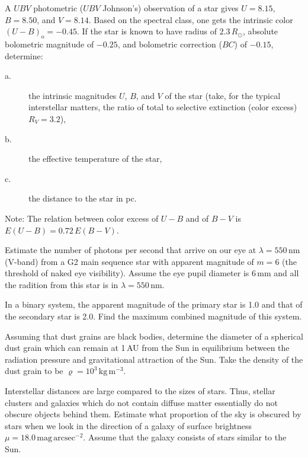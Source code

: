 A $UBV$ photometric ($UBV$ Johnson's) observation of a star gives
$U = 8.15$, $B = 8.50$, and $V = 8.14$. Based on the spectral class, one gets
the intrinsic color $(U-B)_{\mathrm{o}} = -0.45$. If the star is known to
have radius of $2.3\,R_\odot$, absolute bolometric magnitude of $-0.25$, and
bolometric correction ($BC$) of $-0.15$, determine:
\begin{description}
\item[a.] the intrinsic magnitudes $U$, $B$, and $V$ of the star (take, for
  the typical interstellar matters, the ratio of total to selective
  extinction (color excess) $R_V = 3.2$),
\item[b.] the effective temperature of the star,
\item[c.] the distance to the star in pc.
\end{description}
Note: The relation between color excess of $U-B$ and of $B-V$ is
$E(U-B) = 0.72\,E(B-V)$.

Estimate the number of photons per second that arrive on our eye at
$\lambda = 550$\,nm (V-band) from a G2 main sequence star with apparent
magnitude of $m = 6$ (the threshold of naked eye visibility). Assume the eye
pupil diameter is 6\,mm and all the radition %
from this star is in
$\lambda = 550$\,nm.

In a binary system, the apparent magnitude of the primary star is 1.0 and
that of the secondary star is 2.0. Find the maximum combined magnitude of
this system.

Assuming that dust grains are black bodies, determine the diameter of a
spherical dust grain which can remain at 1\,AU from the Sun in equilibrium
between the radiation pressure and gravitational attraction of the Sun. Take
the density of the dust grain to be
$\varrho = 10^{3}\,\mathrm{kg\,m^{-3}}$.

Interstellar distances are large compared to the sizes of stars. Thus,
stellar clusters and galaxies which do not contain diffuse matter essentially
do not obscure objects behind them. Estimate what proportion of the sky is
obscured by stars when we look in the direction of a galaxy of surface
brightness $\mu = 18.0\,\mathrm{mag\,arcsec^{-2}}$. Assume that the galaxy
consists of stars similar to the Sun.

